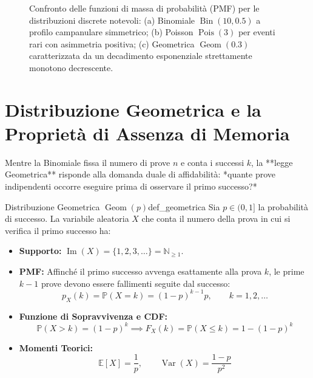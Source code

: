 \begin{figure}[htbp]
    \centering
    
    \caption{Confronto delle funzioni di massa di probabilità (PMF) per le distribuzioni discrete notevoli: (a) Binomiale $\operatorname{Bin}(10, 0.5)$ a profilo campanulare simmetrico; (b) Poisson $\operatorname{Pois}(3)$ per eventi rari con asimmetria positiva; (c) Geometrica $\operatorname{Geom}(0.3)$ caratterizzata da un decadimento esponenziale strettamente monotono decrescente.}
    \label{fig:pmf_discrete_confronto}
\end{figure}

\section{Distribuzione Geometrica e la Proprietà di Assenza di Memoria}
\label{sec:geometrica}

Mentre la Binomiale fissa il numero di prove $n$ e conta i successi $k$, la **legge Geometrica** risponde alla domanda duale di affidabilità: *quante prove indipendenti occorre eseguire prima di osservare il primo successo?*

\begin{definizione}{Distribuzione Geometrica $\operatorname{Geom}(p)$}{def_geometrica}
Sia $p \in (0, 1]$ la probabilità di successo. La variabile aleatoria $X$ che conta il numero della prova in cui si verifica il primo successo ha:
\begin{itemize}
    \item \textbf{Supporto:} $\operatorname{Im}(X) = \{1, 2, 3, \dots\} = \mathbb{N}_{\ge 1}$.
    \item \textbf{PMF:} Affinché il primo successo avvenga esattamente alla prova $k$, le prime $k-1$ prove devono essere fallimenti seguite dal successo:
    \begin{equation}
        p_X(k) = \mathbb{P}(X = k) = (1-p)^{k-1} p, \qquad k = 1, 2, \dots
    \end{equation}
    \item \textbf{Funzione di Sopravvivenza e CDF:}
    \begin{equation}
        \mathbb{P}(X > k) = (1-p)^k \implies F_X(k) = \mathbb{P}(X \le k) = 1 - (1-p)^k
    \end{equation}
    \item \textbf{Momenti Teorici:}
    \begin{equation}
        \mathbb{E}[X] = \frac{1}{p}, \qquad \operatorname{Var}(X) = \frac{1-p}{p^2}
    \end{equation}
\end{itemize}
\end{definizione}

